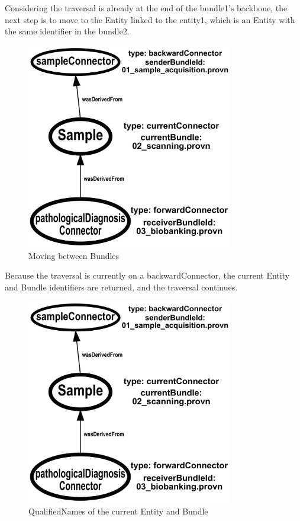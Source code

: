 \documentclass[
  digital,     %
  oneside,     %
  nosansbold,  %
  nocolorbold, %
  lof,         %
  lot,         %
]{fithesis4}
\begin{document}
Considering the traversal is already at the end of the bundle1's backbone, the next step is to move to the Entity linked to the entity1, which is an Entity with the same identifier in the bundle2.

\begin{figure}[htbp]
  \begin{center}
    \includegraphics[width=9cm]{fithesis/images/examplebigger.png}
  \end{center}
  \caption{Moving between Bundles}
  \label{fig:bundleexample2}
\end{figure}

Because the traversal is currently on a backwardConnector, the current Entity and Bundle identifiers are returned, and the traversal continues.

\begin{figure}[htbp]
  \begin{center}
    \includegraphics[width=9cm]{fithesis/images/examplebigger.png}
  \end{center}
  \caption{QualifiedNames of the current Entity and Bundle}
  \label{fig:bundleexample3}
\end{figure}
\end{document}
